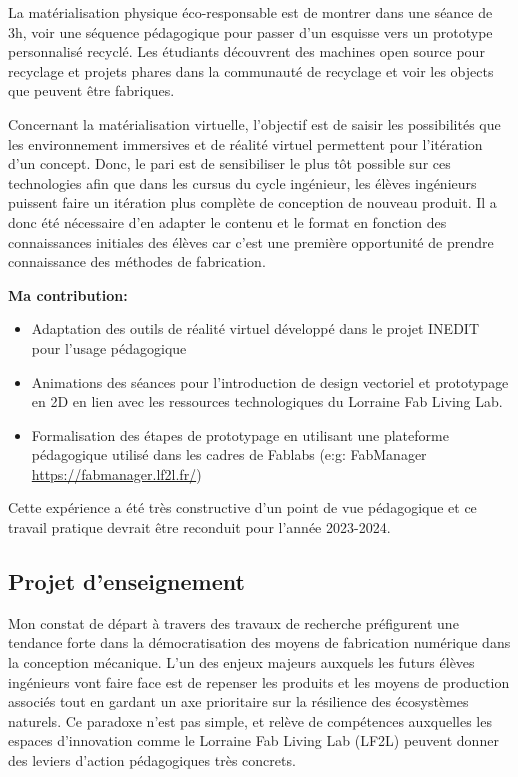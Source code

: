 \documentclass[
  11pt,
]{article}
\providecommand{\tightlist}{%
  \setlength{\itemsep}{0pt}\setlength{\parskip}{0pt}}\usepackage{longtable,booktabs,array}
\begin{document}
La matérialisation physique éco-responsable est de montrer dans une
séance de 3h, voir une séquence pédagogique pour passer d'un esquisse
vers un prototype personnalisé recyclé. Les étudiants découvrent des
machines open source pour recyclage et projets phares dans la communauté
de recyclage et voir les objects que peuvent être fabriques.

Concernant la matérialisation virtuelle, l'objectif est de saisir les
possibilités que les environnement immersives et de réalité virtuel
permettent pour l'itération d'un concept. Donc, le pari est de
sensibiliser le plus tôt possible sur ces technologies afin que dans les
cursus du cycle ingénieur, les élèves ingénieurs puissent faire un
itération plus complète de conception de nouveau produit. Il a donc été
nécessaire d'en adapter le contenu et le format en fonction des
connaissances initiales des élèves car c'est une première opportunité de
prendre connaissance des méthodes de fabrication.

\textbf{Ma contribution: }

\begin{itemize}
\tightlist
\item
  Adaptation des outils de réalité virtuel développé dans le projet
  INEDIT pour l'usage pédagogique
\item
  Animations des séances pour l'introduction de design vectoriel et
  prototypage en 2D en lien avec les ressources technologiques du
  Lorraine Fab Living Lab.
\item
  Formalisation des étapes de prototypage en utilisant une plateforme
  pédagogique utilisé dans les cadres de Fablabs (e:g: FabManager
  \url{https://fabmanager.lf2l.fr/})
\end{itemize}

Cette expérience a été très constructive d'un point de vue pédagogique
et ce travail pratique devrait être reconduit pour l'année 2023-2024.

\hypertarget{projet-denseignement}{%
\subsection{Projet d'enseignement}\label{projet-denseignement}}

Mon constat de départ à travers des travaux de recherche préfigurent une
tendance forte dans la démocratisation des moyens de fabrication
numérique dans la conception mécanique. L'un des enjeux majeurs auxquels
les futurs élèves ingénieurs vont faire face est de repenser les
produits et les moyens de production associés tout en gardant un axe
prioritaire sur la résilience des écosystèmes naturels. Ce paradoxe
n'est pas simple, et relève de compétences auxquelles les espaces
d'innovation comme le Lorraine Fab Living Lab (LF2L) peuvent donner des
leviers d'action pédagogiques très concrets.
\end{document}
